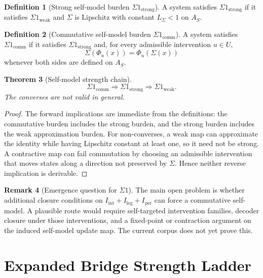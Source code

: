 \documentclass[11pt,a4paper]{article}
\newtheorem{theorem}{Theorem}[section]
\theoremstyle{definition}
\newtheorem{definition}[theorem]{Definition}
\newtheorem{remark}[theorem]{Remark}
\newcommand{\Aset}{A_S}
\newcommand{\Iper}{I_{\mathrm{per}}}
\newcommand{\Iint}{I_{\mathrm{int}}}
\newcommand{\Ileg}{I_{\mathrm{leg}}}
\begin{document}
\begin{definition}[Strong self-model burden $\Sigma1_{\mathrm{strong}}$]\label{def:sigma-strong}
A system satisfies $\Sigma1_{\mathrm{strong}}$ if it satisfies
$\Sigma1_{\mathrm{weak}}$ and $\Sigma$ is Lipschitz with constant
$L_\Sigma<1$ on $\Aset$.
\end{definition}

\begin{definition}[Commutative self-model burden $\Sigma1_{\mathrm{comm}}$]\label{def:sigma-comm}
A system satisfies $\Sigma1_{\mathrm{comm}}$ if it satisfies
$\Sigma1_{\mathrm{strong}}$ and, for every admissible intervention $u\in U$,
\[
\Sigma(\Phi_u(x))=\Phi_u(\Sigma(x))
\]
whenever both sides are defined on $\Aset$.
\end{definition}

\begin{theorem}[Self-model strength chain]\label{thm:sigma-chain}
\[
\Sigma1_{\mathrm{comm}}
\Rightarrow
\Sigma1_{\mathrm{strong}}
\Rightarrow
\Sigma1_{\mathrm{weak}}.
\]
The converses are not valid in general.
\end{theorem}

\begin{proof}
The forward implications are immediate from the definitions: the commutative
burden includes the strong burden, and the strong burden includes the weak
approximation burden. For non-converses, a weak map can approximate the identity
while having Lipschitz constant at least one, so it need not be strong. A
contractive map can fail commutation by choosing an admissible intervention that
moves states along a direction not preserved by $\Sigma$. Hence neither reverse
implication is derivable.
\end{proof}

\begin{remark}[Emergence question for $\Sigma1$]
The main open problem is whether additional closure conditions on
$\Iint+\Ileg+\Iper$ can force a commutative self-model. A plausible route would
require self-targeted intervention families, decoder closure under those
interventions, and a fixed-point or contraction argument on the induced
self-model update map. The current corpus does not yet prove this.
\end{remark}

\section{Expanded Bridge Strength Ladder}
\end{document}
